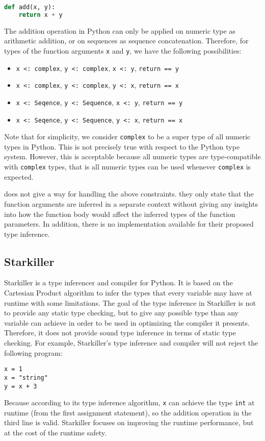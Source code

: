 \begin{lstlisting}[language=Python]
def add(x, y):
	return x + y
\end{lstlisting}
The addition operation in Python can only be applied on numeric type as arithmetic addition, or on sequences as sequence concatenation. Therefore, for types of the function arguments \lstinline|x| and \lstinline|y|, we have the following possibilities:
\begin{itemize}
	\item \lstinline|x <: complex|, \lstinline|y <: complex|, \lstinline|x <: y|, \lstinline|return == y|
	\item \lstinline|x <: complex|, \lstinline|y <: complex|, \lstinline|y <: x|, \lstinline|return == x|
	\item \lstinline|x <: Seqence|, \lstinline|y <: Sequence|, \lstinline|x <: y|, \lstinline|return == y|
	\item \lstinline|x <: Seqence|, \lstinline|y <: Sequence|, \lstinline|y <: x|, \lstinline|return == x|
\end{itemize}
Note that for simplicity, we consider \lstinline|complex| to be a super type of all numeric types in Python. This is not precisely true with respect to the Python type system. However, this is acceptable because all numeric types are type-compatible with \lstinline|complex| types, that is all numeric types can be used whenever \lstinline|complex| is expected.

\cite{porto} does not give a way for handling the above constraints. they only state that the function arguments are inferred in a separate context without giving any insights into how the function body would affect the inferred types of the function parameters. In addition, there is no implementation available for their proposed type inference.

\subsection{Starkiller \cite{starkiller}}
Starkiller is a type inferencer and compiler for Python. It is based on the Cartesian Product algorithm to infer the types that every variable may have at runtime with some limitations. The goal of the type inference in Starkiller is not to provide any static type checking, but to give any possible type than any variable can achieve in order to be used in optimizing the compiler it presents. Therefore, it does not provide sound type inference in terms of static type checking. For example, Starkiller's type inference and compiler will not reject the following program:
\begin{lstlisting}
x = 1
x = "string"
y = x + 3
\end{lstlisting}
Because according to its type inference algorithm, \lstinline|x| can achieve the type \lstinline|int| at runtime (from the first assignment statement), so the addition operation in the third line is valid. Starkiller focuses on improving the runtime performance, but at the cost of the runtime safety.

